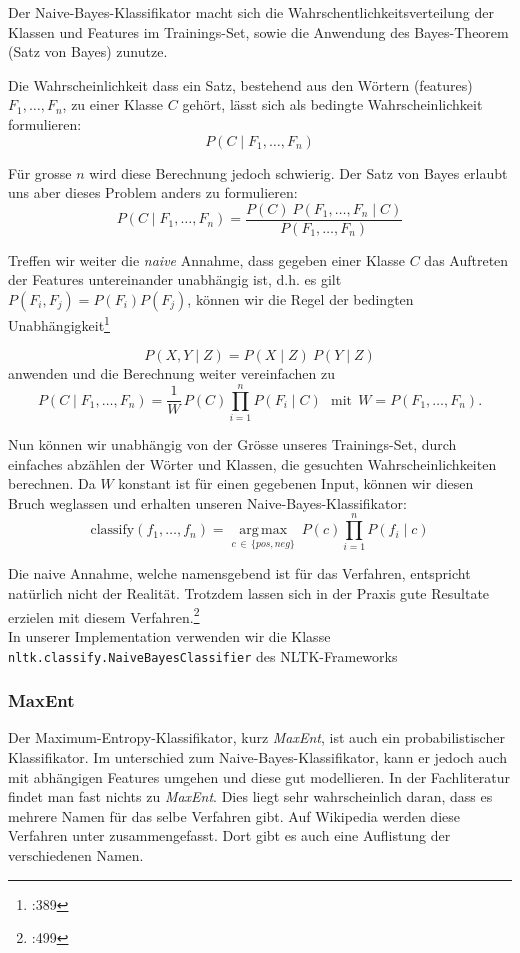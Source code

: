 \documentclass[12pt, oneside]{report}   	%
\begin{document}
Der Naive-Bayes-Klassifikator macht sich die Wahrschentlichkeitsverteilung der Klassen und Features im Trainings-Set, sowie die Anwendung des Bayes-Theorem (Satz von Bayes) zunutze.

Die Wahrscheinlichkeit dass ein Satz, bestehend aus den Wörtern (features) $F_1,\dots,F_n$, zu einer Klasse $C$ gehört, lässt sich als bedingte Wahrscheinlichkeit formulieren:
$$ P(C \mid F_1,\dots,F_n)$$

Für grosse $n$ wird diese Berechnung jedoch schwierig. Der Satz von Bayes erlaubt uns aber dieses Problem anders zu formulieren:
$$
P(C \mid F_1,\dots,F_n) = \frac{P(C) \ P(F_1,\dots,F_n\mid C )}{P(F_1,\dots,F_n)}
$$

Treffen wir weiter die \emph{naive} Annahme, dass gegeben einer Klasse $C$ das Auftreten der Features untereinander unabhängig ist,
d.h. es gilt $P(F_i,F_j) = P(F_i)P(F_j)$, können wir die Regel der bedingten Unabhängigkeit\footnote{\cite{alp}:389 }

$$ P(X,Y \mid Z) = P(X \mid Z) \ P(Y \mid Z) $$
anwenden und die Berechnung weiter vereinfachen zu
$$
P(C \mid F_1,\dots,F_n) = \frac{1}{W} \, P(C) \prod_{i=1}^n P(F_i\mid C)\ \ \ \mathrm{mit} \ \ W = P(F_1,\dots,F_n).
$$

Nun können wir unabhängig von der Grösse unseres Trainings-Set, durch einfaches abzählen der Wörter und Klassen, die gesuchten Wahrscheinlichkeiten berechnen.
Da $W$ konstant ist für einen gegebenen Input, können wir diesen Bruch weglassen und erhalten unseren Naive-Bayes-Klassifikator:
$$ \mathrm{classify}(f_1,\dots,f_n) = \underset{c \, \in \, \{pos,neg\} }{\operatorname{arg\,max}} \ P(c) \displaystyle\prod_{i=1}^n P(f_i\mid c) $$

Die naive Annahme, welche namensgebend ist für das Verfahren, entspricht natürlich nicht der Realität. 
Trotzdem lassen sich in der Praxis gute Resultate erzielen mit diesem Verfahren.\footnote{\cite{ai}:499}
\\

In unserer Implementation verwenden wir die Klasse\\
 \verb|nltk.classify.NaiveBayesClassifier| des NLTK-Frameworks
 


\subsubsection{MaxEnt}

Der Maximum-Entropy-Klassifikator, kurz \emph{MaxEnt}, ist auch ein probabilistischer Klassifikator. Im unterschied zum Naive-Bayes-Klassifikator, kann er jedoch auch mit abhängigen Features umgehen und diese gut modellieren.
In der Fachliteratur findet man fast nichts zu \emph{MaxEnt}. Dies liegt sehr wahrscheinlich daran, dass es mehrere Namen für das selbe Verfahren gibt. 
Auf Wikipedia\cite{mlr} werden diese Verfahren unter  zusammengefasst. Dort gibt es auch eine Auflistung der verschiedenen Namen.
\end{document}
